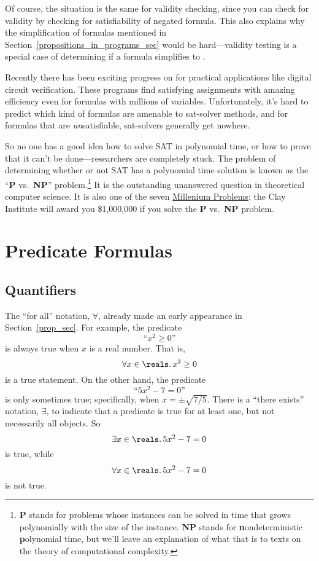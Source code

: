 Of course, the situation is the same for validity checking, since you
can check for validity by checking for satisfiability of negated
formula.  This also explains why the simplification of formulas
mentioned in Section~\ref{propositions_in_programs_sec} would be
hard---validity testing is a special case of determining if a formula
simplifies to \true.

Recently there has been exciting progress on  for
practical applications like digital circuit verification.  These
programs find satisfying assignments with amazing efficiency even for
formulas with millions of variables.  Unfortunately, it's hard to
predict which kind of formulas are amenable to sat-solver methods, and
for formulas that are \emph{un}satisfiable, sat-solvers generally get
nowhere.

So no one has a good idea how to solve SAT in polynomial time, or how
to prove that it can't be done---researchers are completely stuck.
The problem of determining whether or not SAT has a polynomial time
solution is known as the ``\textbf{P} vs.\, \textbf{NP}''
problem.\footnote{\textbf{P} stands for problems whose instances can
be solved in time that grows polynomially with the size of the
instance.  \textbf{NP} stands
for \textbf{n}ondeterministic \textbf{p}olynomial time, but we'll
leave an explanation of what that is to texts on the theory of
computational complexity.}  It is the outstanding unanswered question
in theoretical computer science.  It is also one of the
seven \href{http://www.claymath.org/millennium/}{Millenium Problems}:
the Clay Institute will award you \$1,000,000 if you solve
the \textbf{P} vs.\, \textbf{NP} problem.

\begin{problems}

\homeworkproblems
{}

\end{problems}

\section{Predicate Formulas}\label{predicate_sec}

\subsection{Quantifiers}\label{quantifier_sec}
The ``for all'' notation, $\forall$, already made an early appearance in
Section~\ref{prop_sec}.  For example, the predicate
%
\[
\text{``$x^2 \geq 0$''}
\]
%
is always true when $x$ is a real number.  That is,
\[
\forall x \in \reals.\, x^2 \geq 0
\]
is a true statement.  On the other hand, the predicate
%
\[
\text{``$5x^2 - 7 = 0$''}
\]
%
is only sometimes true; specifically, when $x = \pm \sqrt{7/5}$.
There is a ``there exists'' notation, $\exists$, to indicate that a
predicate is true for at least one, but not necessarily all objects.
So 
\[
\exists x \in \reals.\, 5x^2 - 7 = 0
\]
is true, while
\[
\forall x \in \reals.\, 5x^2 - 7 = 0
\]
is not true.

